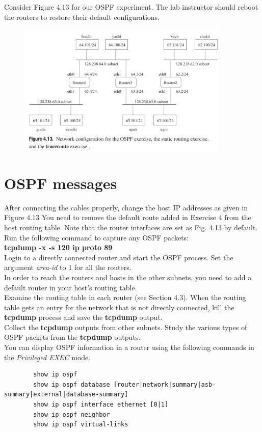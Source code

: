 \documentclass[10pt,a4paper]{article}
\numberwithin{equation}{section}
\numberwithin{figure}{section}
\numberwithin{table}{section}
\begin{document}
    Consider Figure 4.13 for our OSPF experiment.
    The lab instructor should reboot the routers to restore their default configurations.
    \begin{figure}[H]
        \centering
        \includegraphics[width=0.9\textwidth]{img/figure4-13.png}
    \end{figure}

\section{OSPF messages}
    After connecting the cables properly, change the host IP addresses as given in Figure 4.13 You need to remove the default route added in Exercise 4 from the host routing table.
    Note that the router interfaces are set as Fig. 4.13 by default. \\
    Run the following command to capture any OSPF packets: \\
    \textbf{tcpdump -x -s 120 ip proto 89} \\
    Login to a directly connected router and start the OSPF process.
    Set the argument \textit{area-id} to 1 for all the routers. \\
    In order to reach the routers and hosts in the other subnets, you need to add a default router in your host’s routing table. \\
    Examine the routing table in each router (see Section 4.3).
    When the routing table gets an entry for the network that is not directly connected, kill the \textbf{tcpdump} process and save the \textbf{tcpdump} output. \\
    Collect the \textbf{tcpdump} outputs from other subnets.
    Study the various types of OSPF packets from the \textbf{tcpdump} outputs. \\
    You can display OSPF information in a router using the following commands in the \textit{Privileged EXEC} mode.
    \begin{verbatim}
        show ip ospf
        show ip ospf database [router|network|summary|asb-summary|external|database-summary]
        show ip ospf interface ethernet [0|1]
        show ip ospf neighbor
        show ip ospf virtual-links
    \end{verbatim}
\end{document}
